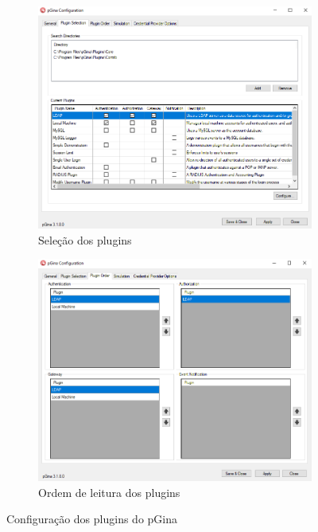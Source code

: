 \begin{figure}[ht]
    \begin{subfigure}{0.48\textwidth}
    	\centering
    	\includegraphics[width=\linewidth]{textuais/PGina2.png}
    	\caption{Seleção dos plugins
    	\label{fig:pgina2}}
    \end{subfigure}%
    \hspace{0.04\textwidth} %
    \begin{subfigure}{0.48\textwidth}
    	\centering
    	\includegraphics[width=\linewidth]{textuais/PGina3.png}
    	\caption{Ordem de leitura dos plugins
    	\label{fig:pgina3}}
    \end{subfigure}
    \caption{Configuração dos plugins do pGina}
    \label{fig:figuras}
\end{figure}

